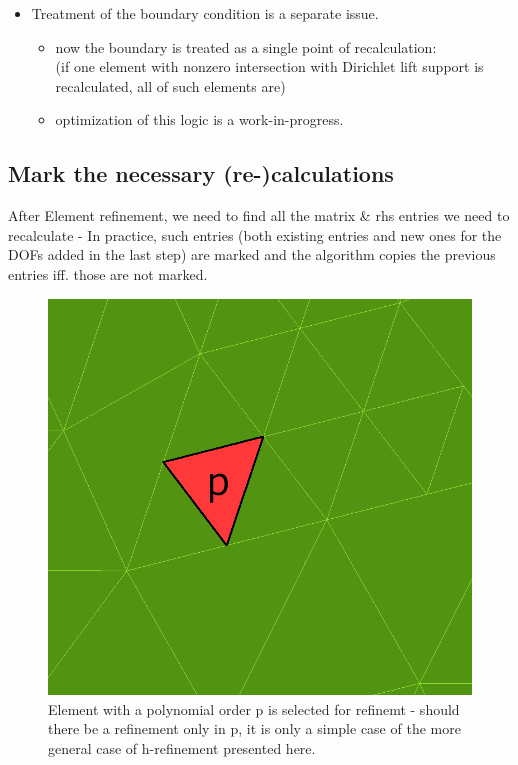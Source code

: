 \documentclass{beamer}
\begin{document}
\begin{frame}
\begin{itemize}
\item \vspace{-2mm} Treatment of the boundary condition is a separate issue.
\begin{itemize}
\item \vspace{-2.5mm} now the boundary is treated as a single point of recalculation:\\
\vspace{-2.5mm} (if one element with nonzero intersection with Dirichlet lift support is recalculated, all of such elements are)
\item \vspace{-2.5mm} optimization of this logic is a work-in-progress.
\end{itemize}
\end{itemize}

\end{frame}


\subsection{Mark the necessary (re-)calculations}

\begin{frame}
After Element refinement, we need to find all the matrix \& rhs entries we need to recalculate - In practice, such entries (both existing entries and new ones for the DOFs added in the last step) are marked and the algorithm copies the previous entries iff. those are not marked.

\begin{center}
	\begin{figure}[h!]
			\centering
			\includegraphics[width=.4\textwidth]{recalculation-1.png}
			\caption{Element with a polynomial order p is selected for refinemt - should there be a refinement only in p, it is only a simple case of the more general case of h-refinement presented here.}
	\end{figure}
\end{center}
\end{frame}
\end{document}
